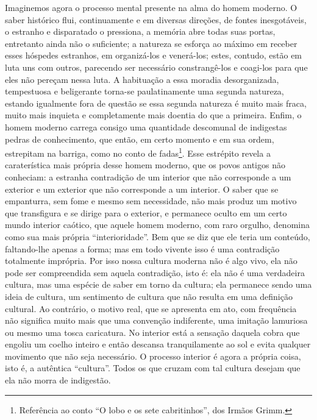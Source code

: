     Imaginemos agora o processo mental presente na alma do homem
    moderno. O saber histórico flui, continuamente e em diversas
    direções, de fontes inesgotáveis, o estranho e disparatado o
    pressiona, a memória abre todas suas portas, entretanto ainda não o
    suficiente; a natureza se esforça ao máximo em receber esses
    hóspedes estranhos, em organizá-los e venerá-los; estes, contudo,
    estão em luta uns com outros, parecendo ser necessário
    constrangê-los e coagi-los para que eles não pereçam nessa luta. A
    habituação a essa moradia desorganizada, tempestuosa e beligerante
    torna-se paulatinamente uma segunda natureza, estando igualmente
    fora de questão se essa segunda natureza é muito mais fraca, muito
    mais inquieta e completamente mais doentia do que a primeira. Enfim,
    o homem moderno carrega consigo uma quantidade descomunal de
    indigestas pedras de conhecimento, que então, em certo momento e em
    sua ordem, estrepitam na barriga, como no conto de fadas\footnote{Referência
      ao conto ``O lobo e os sete cabritinhos'', dos Irmãos Grimm.}.
    Esse estrépito revela a caraterística mais própria desse homem
    moderno, que os povos antigos não conheciam: a estranha contradição
    de um interior que não corresponde a um exterior e um exterior que
    não corresponde a um interior. O saber que se empanturra, sem fome e
    mesmo sem necessidade, não mais produz um motivo que transfigura e
    se dirige para o exterior, e permanece oculto em um certo mundo
    interior caótico, que aquele homem moderno, com raro orgulho,
    denomina como sua mais própria ``interioridade''. Bem que se diz que
    ele teria um conteúdo, faltando-lhe apenas a forma; mas em todo
    vivente isso é uma contradição totalmente imprópria. Por isso
    nossa cultura moderna não é algo vivo, ela não pode ser compreendida
    sem aquela contradição, isto é: ela não é uma verdadeira cultura,
    mas uma espécie de saber em torno da cultura; ela permanece sendo
    uma ideia de cultura, um sentimento de cultura que não resulta em
    uma definição cultural. Ao contrário, o motivo real, que se
    apresenta em ato, com frequência não significa muito mais que uma
    convenção indiferente, uma imitação lamuriosa ou mesmo uma tosca
    caricatura. No interior está a sensação daquela cobra que engoliu um
    coelho inteiro e então descansa tranquilamente ao sol e evita
    qualquer movimento que não seja necessário. O processo interior é
    agora a própria coisa, isto é, a autêntica ``cultura''. Todos os que
    cruzam com tal cultura desejam que ela não morra de indigestão.

